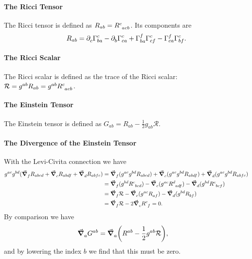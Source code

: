 \paragraph{The Ricci Tensor}
The Ricci tensor is defined as $R_{ab} = \tensor{R}{^{c}_{acb}}$. Its components are
\begin{align*}
	R_{ab} = \del{c}{\chris{c}{b}{a}} - \del{b}{\chris{c}{c}{a}} + \chris{f}{b}{a}\chris{c}{c}{f} - \chris{f}{c}{a}\chris{c}{b}{f} .
\end{align*}

\paragraph{The Ricci Scalar}
The Ricci scalar is defined as the trace of the Ricci scalar: $\mathcal{R} = g^{ab}R_{ab} = g^{ab}\tensor{R}{^{c}_{acb}}$.

\paragraph{The Einstein Tensor}
The Einstein tensor is defined as $G_{ab} = R_{ab} - \frac{1}{2}g_{ab}\mathcal{R}$.

\paragraph{The Divergence of the Einstein Tensor}
With the Levi-Civita connection we have
\begin{align*}
	g^{ac}g^{bd}(\dcov{f}{R_{abcd}} + \dcov{c}{R_{abdf}} + \dcov{d}{R_{abfc}}) &= \dcov{f}{(g^{ac}g^{bd}R_{abcd})} + \dcov{c}{(g^{ac}g^{bd}R_{abdf})} + \dcov{d}{(g^{ac}g^{bd}R_{abfc})} \\
	&= \dcov{f}{(g^{bd}\tensor{R}{^{c}_{bcd}})} - \dcov{c}{(g^{ac}\tensor{R}{^{d}_{adf}})} - \dcov{d}{(g^{bd}\tensor{R}{^{c}_{bcf}})} \\
	&= \dcov{f}{\R} - \dcov{c}{(g^{ac}\tensor{R}{_{af}})} - \dcov{d}{(g^{bd}\tensor{R}{_{bf}})} \\
	&= \dcov{f}{\R} - 2\dcov{c}{\tensor{R}{^{c}_{f}}} = 0.
\end{align*}
By comparison we have
\begin{align*}
	\grad_{a}^{}{G^{ab}} &= \grad_{a}^{}{\left(R^{ab} - \frac{1}{2}g^{ab}\mathcal{R}\right)},
\end{align*}
and by lowering the index $b$ we find that this must be zero.

